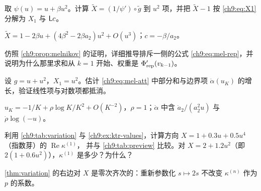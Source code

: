 \begin{exercise}\label{ch9:ex:cocycle-direction}
取 $\psi(u)=u+\beta u^2$。计算 $\tilde X=(1/\psi')\circ\tilde g$ 到 $u^2$ 项，并把 $\tilde X-1$ 按 \eqref{ch9:eq:X1} 分解为 $X_1$ 与 $\mathsf L c$。
\begin{hint}$\tilde X=1-2\beta u+(4\beta^2-2\beta a_2)u^2+O(u^3)$；$c=-\beta/a_2$。\end{hint}
\end{exercise}

\begin{exercise}\label{ch9:ex:melnikov-rep}
仿照 \cref{ch9:prop:melnikov} 的证明，详细推导排斥一侧的公式 \eqref{ch9:eq:mel-rep}，并说明为什么那里求和从 $k=1$ 开始、权重是 $\Phi_{\mathrm{rep}}'(v_{k-1})$。
\end{exercise}

\begin{exercise}\label{ch9:ex:cancellation}
设 $g=u+u^2$，$X_1=u^2$。估计 \eqref{ch9:eq:mel-att} 中部分和与边界项 $\dot\alpha(u_K)$ 的增长，验证线性项与对数项都抵消。
\begin{hint}$u_K=-1/K+\rho\log K/K^2+O(K^{-2})$，$\rho=1$；$\dot\alpha$ 中含 $\dot a_2/(a_2^2u)$ 与 $\dot\rho\log(-u)$。\end{hint}
\end{exercise}

\begin{exercise}\label{ch9:ex:numbers}
利用 \cref{ch9:tab:variation} 与 \cref{ch9:ex:ktr-values}，计算方向 $X=1+0.3u+0.5u^4$（指数芽）的 $\operatorname{Re}\kappa^{(1)}$，
并与 \cref{ch9:tab:preview} 比较。对 $X=2+1.2u^2$（即 $2(1+0.6u^2)$），$\kappa^{(1)}$ 是多少？为什么？
\begin{hint}\cref{thm:variation} 的右边对 $X$ 是零次齐次的：重新参数化 $s\mapsto2s$ 不改变 $\kappa^{(n)}$ 作为 $p$ 的系数。\end{hint}
\end{exercise}
